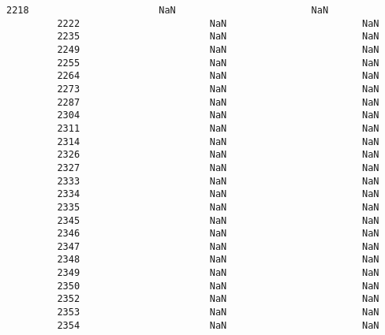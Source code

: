 \documentclass[11pt]{article}
\begin{document}
\begin{Verbatim}[commandchars=\\\{\}]
         2218                       NaN                        NaN   
         2222                       NaN                        NaN   
         2235                       NaN                        NaN   
         2249                       NaN                        NaN   
         2255                       NaN                        NaN   
         2264                       NaN                        NaN   
         2273                       NaN                        NaN   
         2287                       NaN                        NaN   
         2304                       NaN                        NaN   
         2311                       NaN                        NaN   
         2314                       NaN                        NaN   
         2326                       NaN                        NaN   
         2327                       NaN                        NaN   
         2333                       NaN                        NaN   
         2334                       NaN                        NaN   
         2335                       NaN                        NaN   
         2345                       NaN                        NaN   
         2346                       NaN                        NaN   
         2347                       NaN                        NaN   
         2348                       NaN                        NaN   
         2349                       NaN                        NaN   
         2350                       NaN                        NaN   
         2352                       NaN                        NaN   
         2353                       NaN                        NaN   
         2354                       NaN                        NaN   
         

\end{Verbatim}
\end{document}
